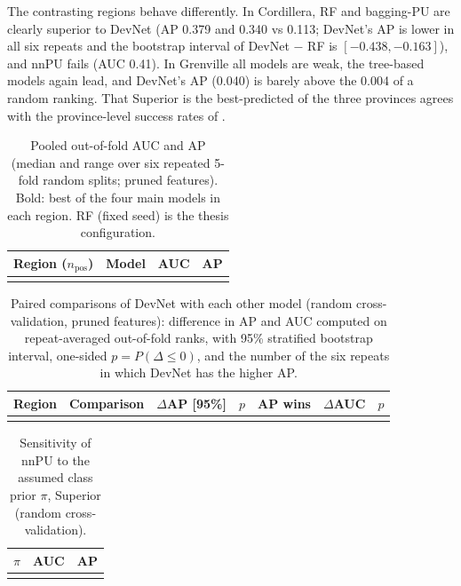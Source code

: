 \documentclass[pdflatex,sn-apa]{sn-jnl}
\begin{document}
The contrasting regions behave differently. In Cordillera, RF and bagging-PU are clearly superior to DevNet (AP 0.379 and 0.340 vs 0.113; DevNet's AP is lower in all six repeats and the bootstrap interval of DevNet $-$ RF is $[-0.438, -0.163]$), and nnPU fails (AUC 0.41). In Grenville all models are weak, the tree-based models again lead, and DevNet's AP (0.040) is barely above the 0.004 of a random ranking. That Superior is the best-predicted of the three provinces agrees with the province-level success rates of \citet{Parsa2024}.

\begin{table}[t]
\caption{Pooled out-of-fold AUC and AP (median and range over six repeated 5-fold random splits; pruned features). Bold: best of the four main models in each region. RF (fixed seed) is the thesis configuration.}\label{tab:benchmark}
\footnotesize
\begin{tabular*}{\textwidth}{@{\extracolsep\fill}llcc}
\toprule
Region ($n_{\mathrm{pos}}$) & Model & AUC & AP \\
\midrule
\botrule
\end{tabular*}
\end{table}

\begin{table}[t]
\caption{Paired comparisons of DevNet with each other model (random cross-validation, pruned features): difference in AP and AUC computed on repeat-averaged out-of-fold ranks, with 95\% stratified bootstrap interval, one-sided $p = P(\Delta \leq 0)$, and the number of the six repeats in which DevNet has the higher AP.}\label{tab:bootstrap}
\footnotesize
\setlength{\tabcolsep}{2.5pt}
\begin{tabular*}{\textwidth}{@{\extracolsep\fill}llccccc}
\toprule
Region & Comparison & $\Delta$AP [95\%] & $p$ & AP wins & $\Delta$AUC & $p$ \\
\midrule
\botrule
\end{tabular*}
\end{table}

\begin{table}[t]
\caption{Sensitivity of nnPU to the assumed class prior $\pi$, Superior (random cross-validation).}\label{tab:prior}
\footnotesize
\begin{tabular*}{0.6\textwidth}{@{\extracolsep\fill}lcc}
\toprule
$\pi$ & AUC & AP \\
\midrule
\botrule
\end{tabular*}
\end{table}
\end{document}
